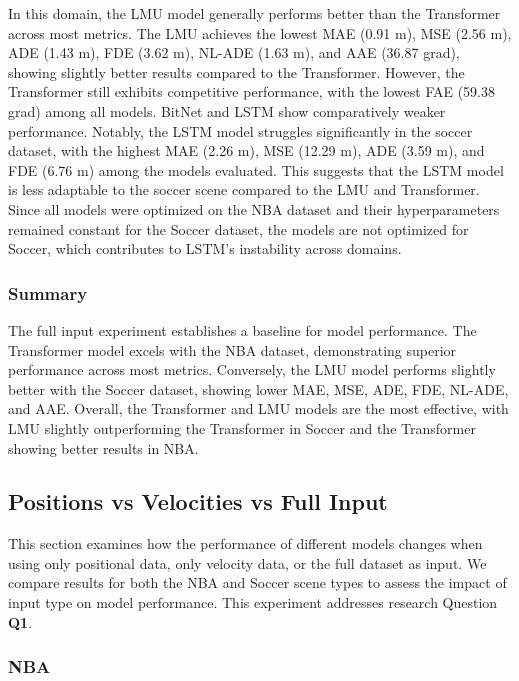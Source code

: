 In this domain, the LMU model generally performs better than the Transformer across most metrics. The LMU achieves the lowest MAE (0.91 m), MSE (2.56 m), ADE (1.43 m), FDE (3.62 m), NL-ADE (1.63 m), and AAE (36.87 grad), showing slightly better results compared to the Transformer. However, the Transformer still exhibits competitive performance, with the lowest FAE (59.38 grad) among all models. BitNet and LSTM show comparatively weaker performance. Notably, the LSTM model struggles significantly in the soccer dataset, with the highest MAE (2.26 m), MSE (12.29 m), ADE (3.59 m), and FDE (6.76 m) among the models evaluated. This suggests that the LSTM model is less adaptable to the soccer scene compared to the LMU and Transformer. Since all models were optimized on the NBA dataset and their hyperparameters remained constant for the Soccer dataset, the models are not optimized for Soccer, which contributes to LSTM’s instability across domains.

\subsubsection{Summary}
The full input experiment establishes a baseline for model performance. The Transformer model excels with the NBA dataset, demonstrating superior performance across most metrics. Conversely, the LMU model performs slightly better with the Soccer dataset, showing lower MAE, MSE, ADE, FDE, NL-ADE, and AAE. Overall, the Transformer and LMU models are the most effective, with LMU slightly outperforming the Transformer in Soccer and the Transformer showing better results in NBA.

\subsection{Positions vs Velocities vs Full Input}
\label{exp:pos_vel}


This section examines how the performance of different models changes when using only positional data, only velocity data, or the full dataset as input. We compare results for both the NBA and Soccer scene types to assess the impact of input type on model performance. This experiment addresses research Question \textbf{Q1}.

\subsubsection{NBA}


